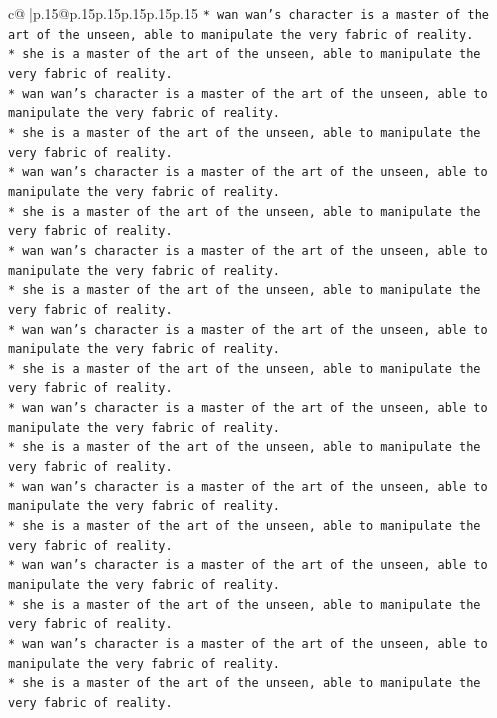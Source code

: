 \documentclass{article}
\begin{document}
{\begin{supertabular}{c@{$\;$}|p{.15\linewidth}@{}p{.15\linewidth}p{.15\linewidth}p{.15\linewidth}p{.15\linewidth}p{.15\linewidth}}
{{{\texttt{* wan wan's character is a master of the art of the unseen, able to manipulate the very fabric of reality.} \\
\texttt{* she is a master of the art of the unseen, able to manipulate the very fabric of reality.} \\
\texttt{* wan wan's character is a master of the art of the unseen, able to manipulate the very fabric of reality.} \\
\texttt{* she is a master of the art of the unseen, able to manipulate the very fabric of reality.} \\
\texttt{* wan wan's character is a master of the art of the unseen, able to manipulate the very fabric of reality.} \\
\texttt{* she is a master of the art of the unseen, able to manipulate the very fabric of reality.} \\
\texttt{* wan wan's character is a master of the art of the unseen, able to manipulate the very fabric of reality.} \\
\texttt{* she is a master of the art of the unseen, able to manipulate the very fabric of reality.} \\
\texttt{* wan wan's character is a master of the art of the unseen, able to manipulate the very fabric of reality.} \\
\texttt{* she is a master of the art of the unseen, able to manipulate the very fabric of reality.} \\
\texttt{* wan wan's character is a master of the art of the unseen, able to manipulate the very fabric of reality.} \\
\texttt{* she is a master of the art of the unseen, able to manipulate the very fabric of reality.} \\
\texttt{* wan wan's character is a master of the art of the unseen, able to manipulate the very fabric of reality.} \\
\texttt{* she is a master of the art of the unseen, able to manipulate the very fabric of reality.} \\
\texttt{* wan wan's character is a master of the art of the unseen, able to manipulate the very fabric of reality.} \\
\texttt{* she is a master of the art of the unseen, able to manipulate the very fabric of reality.} \\
\texttt{* wan wan's character is a master of the art of the unseen, able to manipulate the very fabric of reality.} \\
\texttt{* she is a master of the art of the unseen, able to manipulate the very fabric of reality.} \\
}}}
\end{supertabular}}
\end{document}
